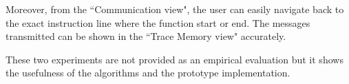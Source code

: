 Moreover, from the ``Communication view", the user can easily navigate back to the exact instruction line where the function start or end. The messages transmitted can be shown in the ``Trace Memory view" accurately.

These two experiments are not provided as an empirical evaluation but it shows the usefulness of the algorithms and the prototype implementation.







   




